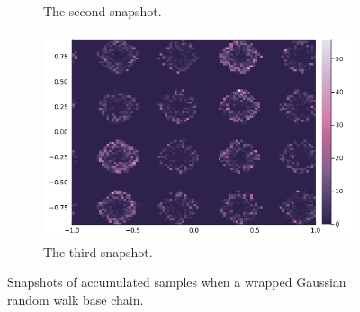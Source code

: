 \documentclass[]{article}
\theoremstyle{definition}
\begin{document}
\begin{figure}[H]
\begin{subfigure}{0.3\textwidth}
                \caption{The second snapshot.}
            \end{subfigure}
            \hfill
            \begin{subfigure}{0.3\textwidth}
                \includegraphics[width=\textwidth]{gaussian_base(3).png}
                \caption{The third snapshot.}
            \end{subfigure}
            \caption{Snapshots of accumulated samples when a wrapped Gaussian random walk base chain.}
            \label{fig:gaussian_rand_bc}
        \end{figure}
\end{document}
